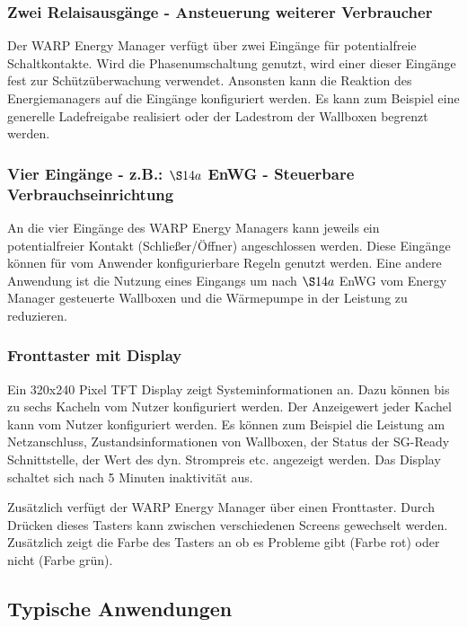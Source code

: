 \documentclass[a4paper,10pt]{article}
\begin{document}
\begin{multicols*}{2}
	\subsubsection{Zwei Relaisausgänge - Ansteuerung weiterer Verbraucher}
	Der WARP Energy Manager verfügt über zwei Eingänge für potentialfreie
	Schaltkontakte. Wird die Phasenumschaltung genutzt, wird einer dieser
	Eingänge fest zur Schützüberwachung verwendet. Ansonsten kann die Reaktion
	des Energiemanagers auf die Eingänge konfiguriert werden. Es kann zum
	Beispiel eine generelle Ladefreigabe realisiert oder der
	Ladestrom der Wallboxen begrenzt werden.

	\subsubsection{Vier Eingänge - z.B.: $\S14a$ EnWG - Steuerbare Verbrauchseinrichtung}
    An die vier Eingänge des WARP Energy Managers kann jeweils ein potentialfreier Kontakt (Schließer/Öffner) angeschlossen werden.
    Diese Eingänge können für vom Anwender konfigurierbare Regeln genutzt werden. Eine andere Anwendung ist die Nutzung eines Eingangs
    um nach $\S14a$ EnWG vom Energy Manager gesteuerte Wallboxen und die Wärmepumpe in der Leistung zu reduzieren.
    
    \subsubsection{Fronttaster mit Display}
    Ein 320x240 Pixel TFT Display zeigt Systeminformationen an. Dazu können bis zu sechs Kacheln vom Nutzer konfiguriert werden.
    Der Anzeigewert jeder Kachel kann vom Nutzer konfiguriert werden. Es können zum Beispiel die Leistung am Netzanschluss, 
    Zustandsinformationen von Wallboxen, der Status der SG-Ready Schnittstelle, der Wert des dyn. Strompreis etc. angezeigt werden.
    Das Display schaltet sich nach 5 Minuten inaktivität aus.
    
    Zusätzlich verfügt der WARP Energy Manager über einen Fronttaster. Durch Drücken dieses Tasters kann zwischen verschiedenen Screens 
    gewechselt werden. Zusätzlich zeigt die Farbe des Tasters an ob es Probleme gibt (Farbe rot) oder nicht (Farbe grün).


    \newpage

	\subsection{Typische Anwendungen}


\end{multicols*}
\end{document}

